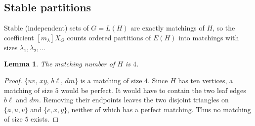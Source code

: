 \documentclass[10pt,a4paper]{amsart}
\newtheorem{lemma}[theorem]{Lemma}
\newcommand{\csf}{X}
\begin{document}
\subsection{Stable partitions}

Stable (independent) sets of $G = L(H)$ are exactly matchings of $H$, so
the coefficient $[m_\lambda] \csf_G$ counts ordered partitions of $E(H)$
into matchings with sizes $\lambda_1, \lambda_2, \dots$


\begin{lemma}
The matching number of $H$ is $4$.
\end{lemma}

\begin{proof}
$\{uv,\, xy,\, b\ell,\, dm\}$ is a matching of size $4$. Since $H$ has ten
vertices, a matching of size $5$ would be perfect. It would have to contain
the two leaf edges $b\ell$ and $dm$. Removing their endpoints leaves the two
disjoint triangles on $\{a,u,v\}$ and $\{c,x,y\}$, neither of which has a
perfect matching. Thus no matching of size $5$ exists.
\end{proof}
\end{document}
